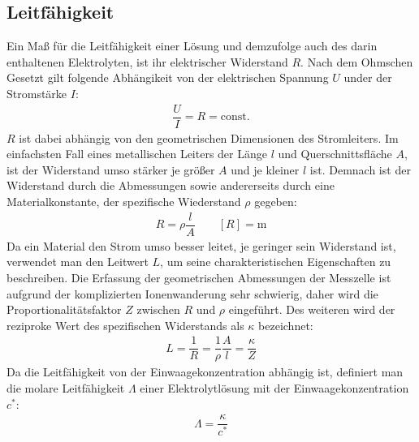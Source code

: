 \documentclass[12pt,a4paper,titlepage,headinclude,bibtotoc]{scrartcl}
\begin{document}
\subsection{Leitfähigkeit}
Ein Maß für die Leitfähigkeit einer Lösung und demzufolge auch des darin enthaltenen Elektrolyten, ist ihr elektrischer Widerstand $R$. Nach dem Ohmschen Gesetzt gilt folgende Abhängikeit von der elektrischen Spannung $U$ under der Stromstärke $I$:
\begin{align}
\dfrac{U}{I} = R = \mathrm{const}.
\end{align}
$R$ ist dabei abhängig von den geometrischen Dimensionen des Stromleiters. Im einfachsten Fall eines metallischen Leiters der Länge $l$ und Querschnittsfläche $A$, ist der Widerstand umso stärker je größer $A$ und je kleiner $l$ ist. Demnach ist der Widerstand durch die Abmessungen sowie andererseits durch eine Materialkonstante, der spezifische Wiederstand $\rho $ gegeben:
\begin{align}
R = \rho \dfrac{l}{A} \quad \quad  [R]=  \mathrm{m}
\end{align} 
Da ein Material den Strom umso besser leitet, je geringer sein Widerstand ist, verwendet man den Leitwert $L$, um seine charakteristischen Eigenschaften zu beschreiben. Die Erfassung der geometrischen Abmessungen der Messzelle ist aufgrund der komplizierten Ionenwanderung sehr schwierig, daher wird die Proportionalitätsfaktor $Z$ zwischen $R$ und $\rho$ eingeführt. Des weiteren wird der reziproke Wert des spezifischen Widerstands als $\kappa$ bezeichnet:
\begin{align}
L = \dfrac{1}{R} = \dfrac{1}{\rho } \dfrac{A}{l} = \dfrac{\kappa }{Z}
\end{align} 
Da die Leitfähigkeit von der Einwaagekonzentration abhängig ist, definiert man die molare Leitfähigkeit $\mathit{\Lambda}$ einer Elektrolytlösung mit der Einwaagekonzentration $c^*$:
\begin{align}
\mathit{\Lambda} = \dfrac{\kappa}{c^*}
\end{align}
\end{document}
